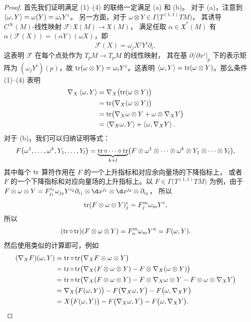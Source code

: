 \begin{proof}
  首先我们证明满足 (1)--(4) 的联络一定满足 (a) 和 (b)。
  对于 (a)，注意到 $\left\langle \omega,Y\right\rangle=\omega(Y)=\omega_iY^i$。
  另一方面，对于 $\omega\otimes Y\in \Gamma\bigl(T^{(1,1)}TM\bigr)$，
  其诱导 $C^\infty(M)$-线性映射 $\mathcal{F}:\mathfrak{X}(M)\to \mathfrak{X}(M)$，
  满足任取 $\alpha\in \mathfrak{X}^*(M)$ 有
  $\alpha(\mathcal{F}(X))=(\alpha Y)(\omega X)$，即
  \[
    \mathcal{F}(X)=\omega_jX^j Y^i\partial_i,
  \]
  这表明 $\mathcal{F}$ 在每个点处作为 $T_pM\to T_pM$ 的线性映射，
  其在基 $\partial/\partial x^i|_p$ 下的表示矩阵为
  $(\omega_j Y^i)(p)$，故 $\operatorname{tr}(\omega\otimes Y)=\omega_iY^i$。这表明
  $\left\langle \omega,Y\right\rangle=\operatorname{tr}(\omega\otimes Y)$。那么条件 (1)--(4) 表明
  \begin{align*}
    \nabla_X\left\langle \omega,Y\right\rangle&=\nabla_X\bigl(\operatorname{tr}(\omega\otimes Y)\bigr)\\
    &=\operatorname{tr}\bigl(\nabla_X(\omega\otimes Y)\bigr)\\
    &=\operatorname{tr}\bigl(\nabla_X\omega\otimes Y+\omega\otimes\nabla_XY\bigr)\\
    &=\left\langle \nabla_X\omega,Y\right\rangle+\left\langle \omega,\nabla_XY\right\rangle.
  \end{align*}
  对于 (b)，我们可以归纳证明等式：
  \[
    F\bigl(\omega^1,\dots,\omega^k,Y_1,\dots,Y_l\bigr)=
    \underbrace{\operatorname{tr}\circ\cdots\circ\operatorname{tr}}_{k+l}
    \bigl(F\otimes\omega^1\otimes\cdots\otimes\omega^k\otimes Y_1\otimes\cdots\otimes Y_l\bigr),
  \]
  其中每个 $\operatorname{tr}$ 算符作用在 $F$ 的一个上升指标和对应余向量场的下降指标上，
  或者 $F$ 的一个下降指标和对应向量场的上升指标上。以 $F\in \Gamma\bigl(T^{(1,1)}TM\bigr)$
  为例，由于 $F\otimes\omega\otimes Y=F_{j_1}^{i_1}\omega_{j_2} Y^{i_2}\partial_{i_1}\otimes \d x^{j_1}\otimes \d x^{j_2}\otimes \partial_{i_2}$，
  所以
  \[
    \operatorname{tr}(F\otimes\omega\otimes Y)_j^i=
    F^m_{j}\omega_m Y^{i},
  \]
  所以 
  \[
    (\operatorname{tr}\circ\operatorname{tr})(F\otimes\omega\otimes Y)=F_n^m\omega_m Y^n
    =F(\omega,Y).  
  \]
  然后使用类似的计算即可，例如
  \begin{align*}
    (\nabla_XF)(\omega,Y)&=\operatorname{tr}\circ\operatorname{tr} \bigl(\nabla_XF\otimes\omega\otimes Y\bigr)
    \\
    &=\operatorname{tr}\circ\operatorname{tr} \bigl(\nabla_X(F\otimes\omega\otimes Y)
    -F\otimes\nabla_X(\omega\otimes Y)\bigr)\\
    &=\operatorname{tr}\circ\operatorname{tr} \bigl(\nabla_X(F\otimes\omega\otimes Y)
    -F\otimes\nabla_X\omega\otimes Y-F\otimes\omega\otimes\nabla_XY\bigr)\\
    &=\nabla_X\bigl(F(\omega,Y)\bigr)-F\bigl(\nabla_X\omega,Y\bigr)
    -F\bigl(\omega,\nabla_XY\bigr)\\
    &=X\bigl(F(\omega,Y)\bigr)-F\bigl(\nabla_X\omega,Y\bigr)
    -F\bigl(\omega,\nabla_XY\bigr).
  \end{align*}


\end{proof}
